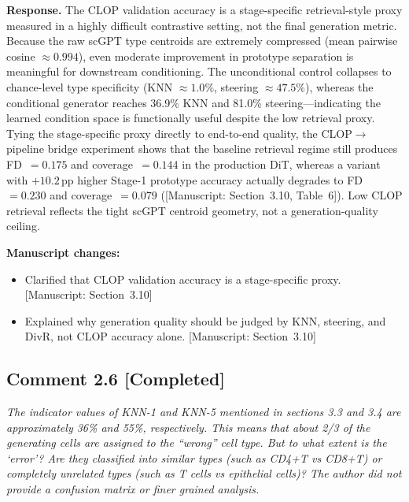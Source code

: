 \documentclass[11pt,letterpaper]{article}
\newcommand{\statuscompleted}{\textcolor{statusgreen}{\textbf{[Completed]}}}
\newcommand{\msref}[1]{\textcolor{blue!60!black}{\textsf{[Manuscript: #1]}}}
\begin{document}
\noindent\textbf{Response.}
The CLOP validation accuracy is a stage-specific retrieval-style proxy measured in a highly difficult contrastive setting, not the final generation metric. Because the raw scGPT type centroids are extremely compressed (mean pairwise cosine $\approx 0.994$), even moderate improvement in prototype separation is meaningful for downstream conditioning. The unconditional control collapses to chance-level type specificity (KNN $\approx 1.0\%$, steering $\approx 47.5\%$), whereas the conditional generator reaches 36.9\% KNN and 81.0\% steering---indicating the learned condition space is functionally useful despite the low retrieval proxy. Tying the stage-specific proxy directly to end-to-end quality, the CLOP$\to$pipeline bridge experiment shows that the baseline retrieval regime still produces FD~$=0.175$ and coverage~$=0.144$ in the production DiT, whereas a variant with $+10.2$\,pp higher Stage-1 prototype accuracy actually degrades to FD~$=0.230$ and coverage~$=0.079$ (\msref{Section~3.10, Table~6}). Low CLOP retrieval reflects the tight scGPT centroid geometry, not a generation-quality ceiling.

\noindent\textbf{Manuscript changes:}
\begin{itemize}
  \item Clarified that CLOP validation accuracy is a stage-specific proxy. \msref{Section~3.10}
  \item Explained why generation quality should be judged by KNN, steering, and DivR, not CLOP accuracy alone. \msref{Section~3.10}
\end{itemize}

\medskip

\subsection*{Comment 2.6 \hfill \statuscompleted}

\begin{reviewercomment}
\itshape
The indicator values of KNN-1 and KNN-5 mentioned in sections 3.3 and 3.4 are approximately 36\% and 55\%, respectively. This means that about 2/3 of the generating cells are assigned to the ``wrong'' cell type. But to what extent is the `error'? Are they classified into similar types (such as CD4+T vs CD8+T) or completely unrelated types (such as T cells vs epithelial cells)? The author did not provide a confusion matrix or finer grained analysis.
\end{reviewercomment}
\end{document}
